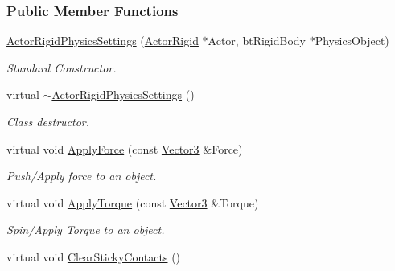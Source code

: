 \subsubsection*{Public Member Functions}
\begin{DoxyCompactItemize}
\item 
\hyperlink{classMezzanine_1_1ActorRigidPhysicsSettings_a01aac76583a043e4917546ab6fabe160}{ActorRigidPhysicsSettings} (\hyperlink{classMezzanine_1_1ActorRigid}{ActorRigid} $\ast$Actor, btRigidBody $\ast$PhysicsObject)
\begin{DoxyCompactList}\small\item\em Standard Constructor. \item\end{DoxyCompactList}\item 
virtual \hyperlink{classMezzanine_1_1ActorRigidPhysicsSettings_a56d106b78dfa0ea5415c7928491e4fa7}{$\sim$ActorRigidPhysicsSettings} ()
\begin{DoxyCompactList}\small\item\em Class destructor. \item\end{DoxyCompactList}\item 
virtual void \hyperlink{classMezzanine_1_1ActorRigidPhysicsSettings_aafa276832f06cc6a72f8ff0b8ccea155}{ApplyForce} (const \hyperlink{classMezzanine_1_1Vector3}{Vector3} \&Force)
\begin{DoxyCompactList}\small\item\em Push/Apply force to an object. \item\end{DoxyCompactList}\item 
virtual void \hyperlink{classMezzanine_1_1ActorRigidPhysicsSettings_a431d7e6e6f8a62d1ff626d2ccf5d7a6d}{ApplyTorque} (const \hyperlink{classMezzanine_1_1Vector3}{Vector3} \&Torque)
\begin{DoxyCompactList}\small\item\em Spin/Apply Torque to an object. \item\end{DoxyCompactList}\item 
\hypertarget{classMezzanine_1_1ActorRigidPhysicsSettings_a6a5f7320087dc36d235ed9551bba193a}{
virtual void \hyperlink{classMezzanine_1_1ActorRigidPhysicsSettings_a6a5f7320087dc36d235ed9551bba193a}{ClearStickyContacts} ()}
\label{classMezzanine_1_1ActorRigidPhysicsSettings_a6a5f7320087dc36d235ed9551bba193a}


\end{DoxyCompactItemize}
